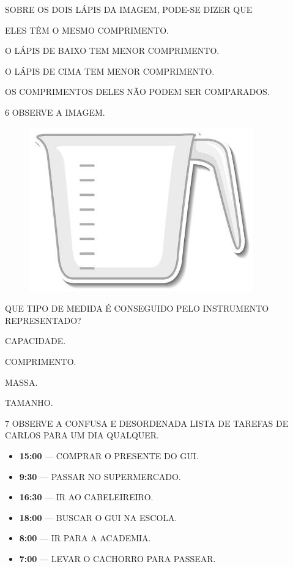 SOBRE OS DOIS LÁPIS DA IMAGEM, PODE-SE DIZER QUE

\begin{escolha}[itemsep=0pt]
\item ELES TÊM O MESMO COMPRIMENTO.

\item O LÁPIS DE BAIXO TEM MENOR COMPRIMENTO.

\item O LÁPIS DE CIMA TEM MENOR COMPRIMENTO.

\item OS COMPRIMENTOS DELES NÃO PODEM SER COMPARADOS.
\end{escolha}

\num{6} OBSERVE A IMAGEM.


\begin{figure}[H]
\centering
\includegraphics[width=.3\textwidth]{media/image107.jpg}
\end{figure}

QUE TIPO DE MEDIDA É CONSEGUIDO PELO INSTRUMENTO REPRESENTADO?

\begin{escolha}[itemsep=0pt]
\item CAPACIDADE.

\item COMPRIMENTO.

\item MASSA.

\item TAMANHO.
\end{escolha}

\num{7} OBSERVE A CONFUSA E DESORDENADA LISTA DE TAREFAS DE CARLOS PARA UM DIA
QUALQUER.


\begin{itemize}
  \item \textbf{15:00} --- \uppercase{Comprar o presente do Gui.}
  \item \textbf{9:30} --- \uppercase{Passar no supermercado.}
  \item \textbf{16:30} --- \uppercase{Ir ao cabeleireiro.}
  \item \textbf{18:00} --- \uppercase{Buscar o Gui na escola.}
  \item \textbf{8:00} --- \uppercase{Ir para a academia.}
  \item \textbf{7:00} --- \uppercase{Levar o cachorro para passear.}
\end{itemize}

